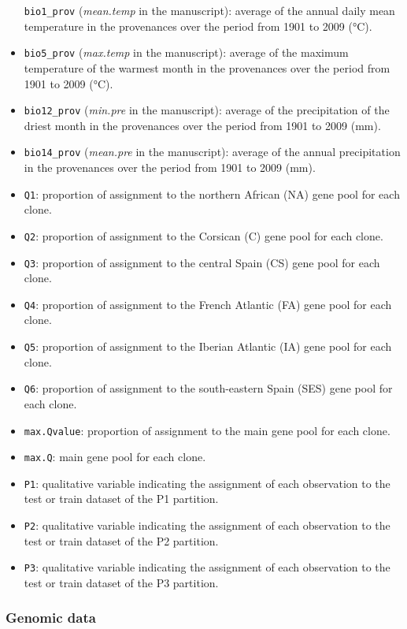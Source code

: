 \documentclass[]{article}
\begin{document}
\begin{itemize}
  \texttt{bio1\_prov} (\emph{mean.temp} in the manuscript): average of
  the annual daily mean temperature in the provenances over the period
  from 1901 to 2009 (°C).
\item
  \texttt{bio5\_prov} (\emph{max.temp} in the manuscript): average of
  the maximum temperature of the warmest month in the provenances over
  the period from 1901 to 2009 (°C).
\item
  \texttt{bio12\_prov} (\emph{min.pre} in the manuscript): average of
  the precipitation of the driest month in the provenances over the
  period from 1901 to 2009 (mm).
\item
  \texttt{bio14\_prov} (\emph{mean.pre} in the manuscript): average of
  the annual precipitation in the provenances over the period from 1901
  to 2009 (mm).
\item
  \texttt{Q1}: proportion of assignment to the northern African (NA)
  gene pool for each clone.
\item
  \texttt{Q2}: proportion of assignment to the Corsican (C) gene pool
  for each clone.
\item
  \texttt{Q3}: proportion of assignment to the central Spain (CS) gene
  pool for each clone.
\item
  \texttt{Q4}: proportion of assignment to the French Atlantic (FA) gene
  pool for each clone.
\item
  \texttt{Q5}: proportion of assignment to the Iberian Atlantic (IA)
  gene pool for each clone.
\item
  \texttt{Q6}: proportion of assignment to the south-eastern Spain (SES)
  gene pool for each clone.
\item
  \texttt{max.Qvalue}: proportion of assignment to the main gene pool
  for each clone.
\item
  \texttt{max.Q}: main gene pool for each clone.
\item
  \texttt{P1}: qualitative variable indicating the assignment of each
  observation to the test or train dataset of the P1 partition.
\item
  \texttt{P2}: qualitative variable indicating the assignment of each
  observation to the test or train dataset of the P2 partition.
\item
  \texttt{P3}: qualitative variable indicating the assignment of each
  observation to the test or train dataset of the P3 partition.
\end{itemize}

\subsubsection{Genomic data}\label{genomic-data}
\end{document}
